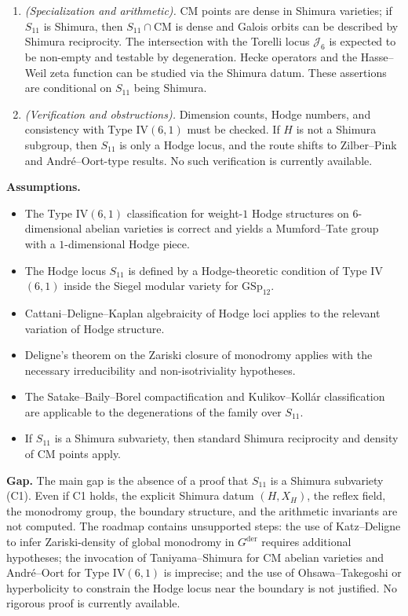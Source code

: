 \documentclass{article}
\begin{document}
\begin{enumerate}
\item[\textbf{Step E}] \emph{(Specialization and arithmetic).} CM points are dense in Shimura varieties; if $S_{11}$ is Shimura, then $S_{11} \cap \mathrm{CM}$ is dense and Galois orbits can be described by Shimura reciprocity. The intersection with the Torelli locus $\mathcal{J}_6$ is expected to be non-empty and testable by degeneration. Hecke operators and the Hasse--Weil zeta function can be studied via the Shimura datum. These assertions are conditional on $S_{11}$ being Shimura.

\item[\textbf{Step F}] \emph{(Verification and obstructions).} Dimension counts, Hodge numbers, and consistency with Type IV$(6,1)$ must be checked. If $H$ is not a Shimura subgroup, then $S_{11}$ is only a Hodge locus, and the route shifts to Zilber--Pink and Andr\'e--Oort-type results. No such verification is currently available.
\end{enumerate}

\medskip
\noindent\textbf{Assumptions.}
\begin{itemize}
\item The Type IV$(6,1)$ classification for weight-$1$ Hodge structures on $6$-dimensional abelian varieties is correct and yields a Mumford--Tate group with a $1$-dimensional Hodge piece.
\item The Hodge locus $S_{11}$ is defined by a Hodge-theoretic condition of Type IV$(6,1)$ inside the Siegel modular variety for $\mathrm{GSp}_{12}$.
\item Cattani--Deligne--Kaplan algebraicity of Hodge loci applies to the relevant variation of Hodge structure.
\item Deligne's theorem on the Zariski closure of monodromy applies with the necessary irreducibility and non-isotriviality hypotheses.
\item The Satake--Baily--Borel compactification and Kulikov--Koll\'ar classification are applicable to the degenerations of the family over $S_{11}$.
\item If $S_{11}$ is a Shimura subvariety, then standard Shimura reciprocity and density of CM points apply.
\end{itemize}

\medskip
\noindent\textbf{Gap.}
The main gap is the absence of a proof that $S_{11}$ is a Shimura subvariety (C1). Even if C1 holds, the explicit Shimura datum $(H, X_H)$, the reflex field, the monodromy group, the boundary structure, and the arithmetic invariants are not computed. The roadmap contains unsupported steps: the use of Katz--Deligne to infer Zariski-density of global monodromy in $G^{\mathrm{der}}$ requires additional hypotheses; the invocation of Taniyama--Shimura for CM abelian varieties and Andr\'e--Oort for Type IV$(6,1)$ is imprecise; and the use of Ohsawa--Takegoshi or hyperbolicity to constrain the Hodge locus near the boundary is not justified. No rigorous proof is currently available.
\end{document}
